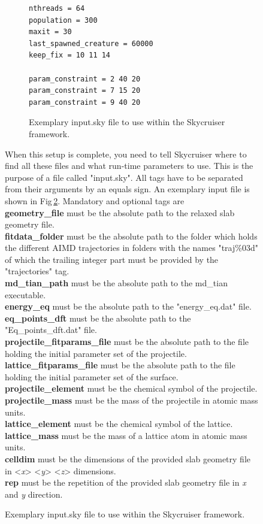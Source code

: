 \documentclass[twoside, 11pt, titlepage, captions=nooneline, a4paper, headsepline]{scrbook}%
\newcommand{\9}{\mathrm}
\newcommand{\0}{\,\mathrm}
\begin{document}
\begin{figure}[b!]
\begin{figure}
\begin{verbatim}
nthreads = 64
population = 300
maxit = 30
last_spawned_creature = 60000
keep_fix = 10 11 14

param_constraint = 2 40 20
param_constraint = 7 15 20
param_constraint = 9 40 20
\end{verbatim}
\caption{Exemplary input.sky file to use within the Skycruiser framework.}
\label{SkycruiserInput}
\end{figure}

When this setup is complete, you need to tell Skycruiser where to find all these files and what run-time parameters to use. This is the purpose of a file called "input.sky". All tags have to be separated from their arguments by an equals sign. An exemplary input file is shown in Fig\,\ref{SkycruiserInput}. Mandatory and optional tags are \\
\textbf{geometry\_file} must be the absolute path to the relaxed slab geometry file.\\
\textbf{fitdata\_folder} must be the absolute path to the folder which holds the different AIMD trajectories in folders with the names "traj\%03d" of which the trailing integer part must be provided by the "trajectories" tag.\\
\textbf{md\_tian\_path} must be the absolute path to the md\_tian executable.\\
\textbf{energy\_eq} must be the absolute path to the "energy\_eq.dat" file.\\
\textbf{eq\_points\_dft} must be the absolute path to the "Eq\_points\_dft.dat" file.\\
\textbf{projectile\_fitparams\_file} must be the absolute path to the file holding the initial parameter set of the projectile.\\
\textbf{lattice\_fitparams\_file} must be the absolute path to the file holding the initial parameter set of the surface.\\
\textbf{projectile\_element} must be the chemical symbol of the projectile.\\
\textbf{projectile\_mass} must be the mass of the projectile in atomic mass units.\\
\textbf{lattice\_element} must be the chemical symbol of the lattice.\\
\textbf{lattice\_mass} must be the mass of a lattice atom in atomic mass units.\\
\textbf{celldim} must be the dimensions of the provided slab geometry file in <\textit{x}> <\textit{y}> <\textit{z}> dimensions.\\
\textbf{rep} must be the repetition of the provided slab geometry file in \textit{x} and \textit{y} direction.\\

\end{figure}
\end{document}

